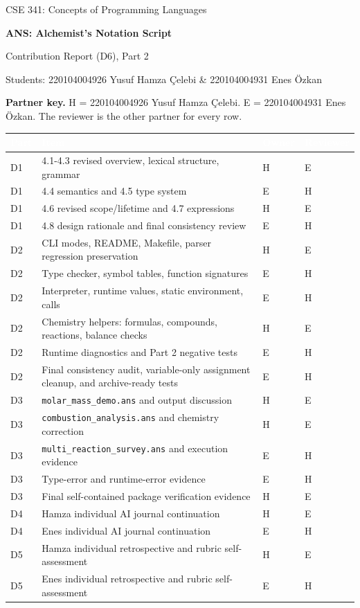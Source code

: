 \documentclass[10pt,a4paper]{article}
\newcommand{\code}[1]{\texttt{#1}}
\begin{document}
\begin{center}
{\footnotesize\color{anscaption}CSE 341: Concepts of Programming Languages\par}
{\Large\bfseries\sffamily ANS: Alchemist's Notation Script\par}
{\normalsize Contribution Report (D6), Part 2\par}
{\footnotesize\color{anscaption}Students: 220104004926 Yusuf Hamza Çelebi \& 220104004931 Enes Özkan}
\end{center}

\textbf{Partner key.} H = 220104004926 Yusuf Hamza Çelebi. E = 220104004931 Enes Özkan. The reviewer is the other partner for every row.

\small
{}
\begin{tabularx}{\textwidth}{@{}L{1.1cm}Y L{2.0cm}L{2.0cm}@{}}
\toprule
{}
\textcolor{white}{Part} & \textcolor{white}{Item} & \textcolor{white}{Owner} & \textcolor{white}{Reviewer} \\
\midrule
D1 & 4.1-4.3 revised overview, lexical structure, grammar & H & E \\
D1 & 4.4 semantics and 4.5 type system & E & H \\
D1 & 4.6 revised scope/lifetime and 4.7 expressions & H & E \\
D1 & 4.8 design rationale and final consistency review & E & H \\
\midrule
D2 & CLI modes, README, Makefile, parser regression preservation & H & E \\
D2 & Type checker, symbol tables, function signatures & E & H \\
D2 & Interpreter, runtime values, static environment, calls & E & H \\
D2 & Chemistry helpers: formulas, compounds, reactions, balance checks & H & E \\
D2 & Runtime diagnostics and Part 2 negative tests & E & H \\
D2 & Final consistency audit, variable-only assignment cleanup, and archive-ready tests & E & H \\
\midrule
D3 & \code{molar\_mass\_demo.ans} and output discussion & H & E \\
D3 & \code{combustion\_analysis.ans} and chemistry correction & H & E \\
D3 & \code{multi\_reaction\_survey.ans} and execution evidence & E & H \\
D3 & Type-error and runtime-error evidence & E & H \\
D3 & Final self-contained package verification evidence & H & E \\
\midrule
D4 & Hamza individual AI journal continuation & H & E \\
D4 & Enes individual AI journal continuation & E & H \\
D5 & Hamza individual retrospective and rubric self-assessment & H & E \\
D5 & Enes individual retrospective and rubric self-assessment & E & H \\
\bottomrule
\end{tabularx}
\normalsize
\end{document}
